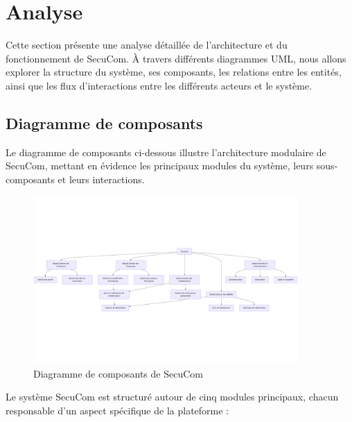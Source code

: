 \chapter{Analyse}

Cette section présente une analyse détaillée de l'architecture et du fonctionnement de SecuCom. À travers différents diagrammes UML, nous allons explorer la structure du système, ses composants, les relations entre les entités, ainsi que les flux d'interactions entre les différents acteurs et le système.

\section{Diagramme de composants}

Le diagramme de composants ci-dessous illustre l'architecture modulaire de SecuCom, mettant en évidence les principaux modules du système, leurs sous-composants et leurs interactions.

\begin{figure}[h]
\centering
\includegraphics[width=0.9\textwidth]{ComposantsDiagram.png}
\caption{Diagramme de composants de SecuCom}
\end{figure}

Le système SecuCom est structuré autour de cinq modules principaux, chacun responsable d'un aspect spécifique de la plateforme :

